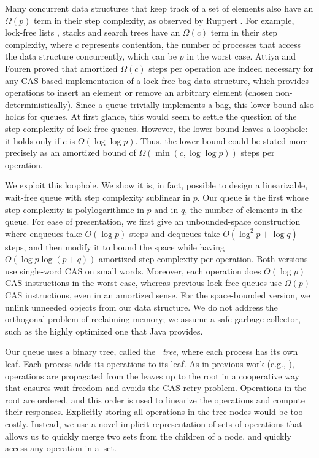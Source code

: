 Many concurrent data structures that keep track of a set of elements also have an $\Omega(p)$ term in their step complexity, as observed by Ruppert \cite{Rup16}.
For example, lock-free lists \cite{FR04,Sha15}, stacks \cite{Tre86} and search trees \cite{EFHR14} 
have an $\Omega(c)$ term in their step complexity, where $c$ represents contention,
the number of processes that access the data structure concurrently, which can be $p$ in the worst case.
Attiya and Fouren \cite{DBLP:conf/opodis/AttiyaF17} proved 
that amortized $\Omega(c)$ steps per operation are indeed necessary
for any CAS-based implementation of a lock-free bag data structure, which provides operations
to insert an element or remove an arbitrary element (chosen non-deterministically).
Since a queue trivially implements a bag, this lower bound also holds for queues.
At first glance, this would seem to settle the question of the step complexity of lock-free queues.
However, the lower bound leaves a loophole:  it holds only if $c$ is $O(\log\log p)$.
Thus, the lower bound could be stated more precisely as an amortized bound of $\Omega(\min(c,\log\log p))$ steps per operation.

We exploit this loophole.  We show  it is, in fact, possible to design a linearizable, wait-free queue
with step complexity sublinear in $p$.
Our queue is the first whose step complexity  is polylogarithmic in $p$ and in $q$, the number of elements in the queue.
For ease of presentation, we first give an unbounded-space construction where enqueues take $O(\log p)$ steps and
dequeues take $O(\log^2 p + \log q)$ steps,
and then modify it to bound the space
while  having $O(\log p\log( p+ q))$ amortized step complexity  per operation.
Both versions use single-word CAS on %
small words.
Moreover, each operation does $O(\log p)$ CAS instructions in the worst case, whereas previous
lock-free queues use 
$\Omega(p)$ CAS instructions, even in an amortized sense.
For the space-bounded version, we unlink unneeded objects from our data structure.
We do not address the orthogonal problem of reclaiming memory; we assume a safe
garbage collector, such as the highly optimized one that Java provides.

Our queue uses a binary tree, called the \emph{\ordering\ tree}, where each process has its own leaf.
Each process adds its operations to its leaf.
As in previous work (e.g., \cite{DBLP:conf/stoc/AfekDT95,DBLP:conf/fsttcs/JayantiP05}), operations are propagated from the leaves up to the root in a cooperative way that ensures wait-freedom
and avoids the CAS retry problem.
Operations in the root are ordered, 
and this order is used to linearize the operations and compute their responses.
Explicitly storing all operations in the tree nodes would be too costly.
Instead, we use a novel implicit representation of sets
of operations that allows us to quickly merge two sets from the children of a node,
and quickly access any  operation in a~set.

